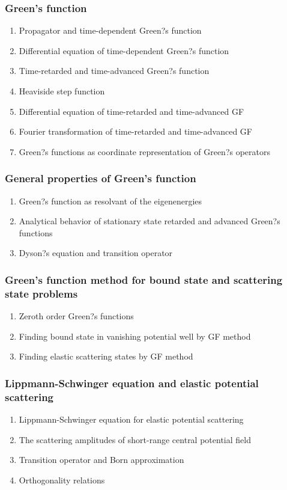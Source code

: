 \documentclass[12pt]{article}
\numberwithin{equation}{section}
\begin{document}
\subsubsection{Green's function}
\begin{enumerate}
\item Propagator and time-dependent Green?s function
\item Differential equation of time-dependent Green?s function
\item Time-retarded and time-advanced Green?s function
\item Heaviside step function
\item Differential equation of time-retarded and time-advanced GF
\item Fourier transformation of time-retarded and time-advanced GF
\item Green?s functions as coordinate representation of Green?s operators
\end{enumerate}
\subsubsection{General properties of Green's function}
\begin{enumerate}
\item Green?s function as resolvant of the eigenenergies
\item Analytical behavior of stationary state retarded and advanced Green?s functions
\item Dyson?s equation and transition operator
\end{enumerate}
\subsubsection{Green's function method for bound state and scattering state problems}
\begin{enumerate}
\item Zeroth order Green?s functions
\item Finding bound state in vanishing potential well by GF method
\item Finding elastic scattering states by GF method
\end{enumerate}
\subsubsection{Lippmann-Schwinger equation and elastic potential scattering}
\begin{enumerate}
\item Lippmann-Schwinger equation for elastic potential scattering
\item The scattering amplitudes of short-range central potential field
\item Transition operator and Born approximation
\item Orthogonality relations
\end{enumerate}
\end{document}
